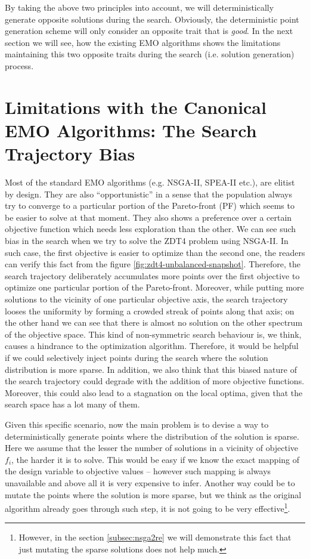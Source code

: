 \documentclass[journal]{IEEEtran}
\begin{document}
By taking the above two principles into account, we will deterministically generate opposite solutions during the search. Obviously, the deterministic point generation scheme will only consider an opposite trait that is \textit{good}. In the next section we will see, how the existing EMO algorithms shows the limitations maintaining this two opposite traits during the search (i.e. solution generation) process.  

\section{Limitations with the Canonical EMO Algorithms: The Search Trajectory Bias}
\label{sec:limitation-canonical}
Most of the standard EMO algorithms (e.g. NSGA-II, SPEA-II \cite{spea2-main} etc.), are elitist by design. They are also ``opportunistic'' in a sense that the population always try to converge to a particular portion of the Pareto-front (PF) which seems to be easier to solve at that moment. They also shows a preference over a certain objective function which needs less exploration than the other. We can see such bias in the search when we try to solve the ZDT4 problem using NSGA-II. In such case, the first objective is easier to optimize than the second one, the readers can verify this fact from the figure \ref{fig:zdt4-unbalanced-snapshot}. Therefore, the search trajectory deliberately accumulates more points over the first objective to optimize one particular portion of the Pareto-front. Moreover, while putting more solutions to the vicinity of one particular objective axis, the search trajectory looses the uniformity by forming a crowded streak of points along that axis; on the other hand we can see that there is almost no solution on the other spectrum of the objective space. This kind of non-symmetric search behaviour is, we think, causes a hindrance to the optimization algorithm. Therefore, it would be helpful if we could selectively inject points during the search where the solution distribution is more sparse. In addition, we also think that this biased nature of the search trajectory could degrade with the addition of more objective functions. Moreover, this could also lead to a stagnation on the local optima, given that the search space has a lot many of them.

Given this specific scenario, now the main problem is to devise a way to deterministically generate points where the distribution of the solution is sparse. Here we assume that the lesser the number of solutions in a vicinity of objective \(f_i\), the harder it is to solve. This would be easy if we know the exact mapping of the design variable to objective values -- however such mapping is always unavailable and above all it is very expensive to infer. Another way could be to mutate the points where the solution is more sparse, but we think as the original algorithm already goes through such step, it is not going to be very effective\footnote{However, in the section \ref{subsec:nsga2re} we will demonstrate this fact that just mutating the sparse solutions does not help much.}. 
\end{document}
